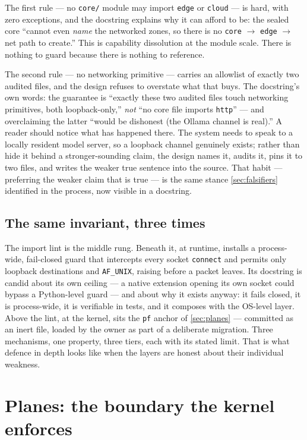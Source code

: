 \noindent The first rule --- no \texttt{core/} module may import \texttt{edge} or
\texttt{cloud} --- is hard, with zero exceptions, and the docstring explains why it
can afford to be: the sealed core ``cannot even \emph{name} the networked zones, so
there is no \texttt{core} $\to$ \texttt{edge} $\to$ net path to create.'' This is
capability dissolution at the module scale. There is nothing to guard because there
is nothing to reference.

The second rule --- no networking primitive --- carries an allowlist of exactly two
audited files, and the design refuses to overstate what that buys. The docstring's
own words: the guarantee is ``exactly these two audited files touch networking
primitives, both loopback-only,'' \emph{not} ``no core file imports \texttt{http}''
--- and overclaiming the latter ``would be dishonest (the Ollama channel is
real).'' A reader should notice what has happened there. The system needs to speak
to a locally resident model server, so a loopback channel genuinely exists; rather
than hide it behind a stronger-sounding claim, the design names it, audits it,
pins it to two files, and writes the weaker true sentence into the source. That
habit --- preferring the weaker claim that is true --- is the same stance
\autoref{sec:falsifiers} identified in the process, now visible in a docstring.

\subsection*{The same invariant, three times}

The import lint is the middle rung. Beneath it, at runtime,
 installs a process-wide, fail-closed guard that
intercepts every socket \texttt{connect} and permits only loopback destinations and
\texttt{AF\_UNIX}, raising before a packet leaves. Its docstring is candid about
its own ceiling --- a native extension opening its own socket could bypass a
Python-level guard --- and about why it exists anyway: it fails closed, it is
process-wide, it is verifiable in tests, and it composes with the OS-level layer.
Above the lint, at the kernel, sits the \texttt{pf} anchor of
\autoref{sec:planes} --- committed as an inert file, loaded by the owner as part
of a deliberate migration. Three mechanisms, one property, three tiers, each with
its stated limit. That is what defence in depth looks like when the layers are
honest about their individual weakness.

\section{Planes: the boundary the kernel enforces}
\label{sec:planes}

